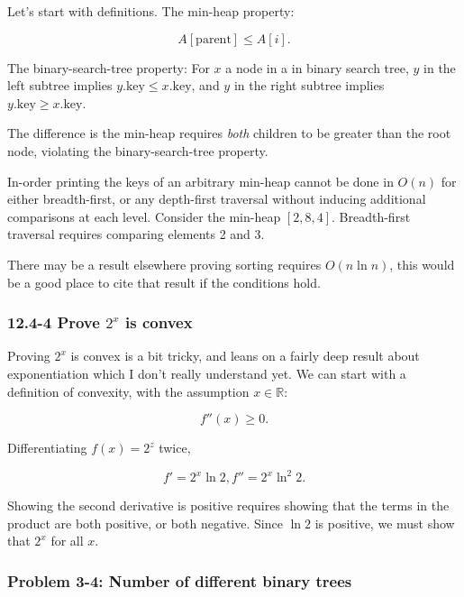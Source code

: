 \documentclass{article}
\begin{document}
Let's start with definitions.
The min-heap property:

\begin{equation}
  A[\mathrm{parent}] \leq A[i].
\end{equation}

The binary-search-tree property: For $x$ a node in a in binary search tree,
$y$ in the left subtree implies $y.\mathrm{key} \leq x.\mathrm{key}$, and
$y$ in the right subtree implies $y.\mathrm{key} \geq x.\mathrm{key}$.

The difference is the min-heap requires \emph{both} children to be
greater than the root node, violating the binary-search-tree property.

In-order printing the keys of an arbitrary min-heap cannot be done in $O(n)$
for either breadth-first, or any depth-first traversal without inducing
additional comparisons at each level. Consider the min-heap $[2, 8, 4]$.
Breadth-first traversal requires comparing elements 2 and 3.

There may be a result elsewhere proving sorting requires $O(n\ln n)$,
this would be a good place to cite that result if the conditions hold.

\subsubsection{12.4-4 Prove $2^x$ is convex}

Proving $2^x$ is convex is a bit tricky, and leans on a fairly deep result about
exponentiation which I don't really understand yet. We can start with a definition
of convexity, with the assumption $x\in\mathbb{R}$:

\begin{equation}
  f''(x) \geq 0.
\end{equation}

Differentiating $f(x) = 2^z$ twice,

\begin{equation}
  f' = 2^x \ln 2, f'' = 2^x\ln^2 2.
\end{equation}

Showing the second derivative is positive requires showing that the
terms in the product are both positive, or both negative. Since $\ln 2$
is positive, we must show that $2^x$ for all $x$.

\subsubsection{Problem 3-4: Number of different binary trees}
\end{document}
